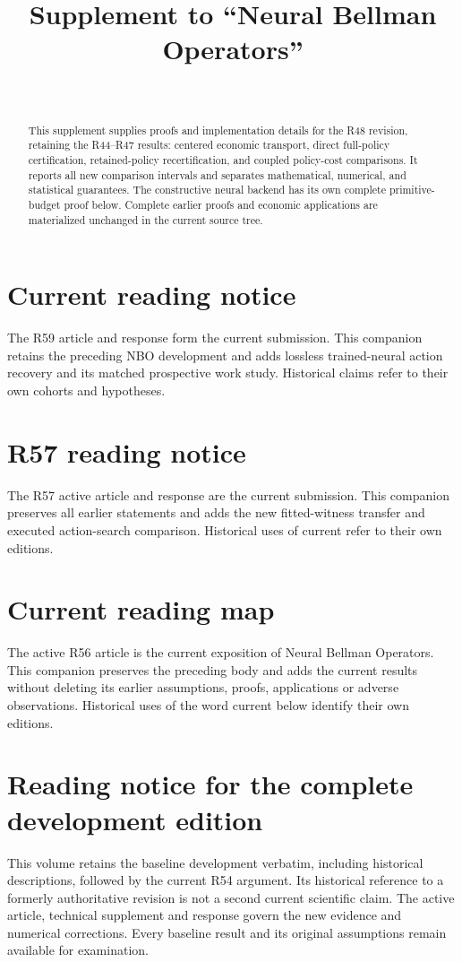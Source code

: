 \documentclass[ecta,nameyear,draft]{econsocart}
\begin{document}
\begin{frontmatter}
\title{Supplement to ``Neural Bellman Operators''}
\begin{aug}
\author[id=au1,addressref={add1}]{~}
\address[id=add1]{Peking University}
\end{aug}
\begin{abstract}
This supplement supplies proofs and implementation details for the R48 revision, retaining the R44--R47 results: centered economic transport, direct full-policy certification, retained-policy recertification, and coupled policy-cost comparisons. It reports all new comparison intervals and separates mathematical, numerical, and statistical guarantees. The constructive neural backend has its own complete primitive-budget proof below. Complete earlier proofs and economic applications are materialized unchanged in the current source tree.
\end{abstract}
\end{frontmatter}
\section*{Current reading notice}
The R59 article and response form the current submission. This companion retains the preceding NBO development and adds lossless trained-neural action recovery and its matched prospective work study. Historical claims refer to their own cohorts and hypotheses.

\section*{R57 reading notice}
The R57 active article and response are the current submission. This companion preserves all earlier statements and adds the new fitted-witness transfer and executed action-search comparison. Historical uses of current refer to their own editions.

\section*{Current reading map}
The active R56 article is the current exposition of Neural Bellman Operators. This companion preserves the preceding body and adds the current results without deleting its earlier assumptions, proofs, applications or adverse observations. Historical uses of the word current below identify their own editions.

\section*{Reading notice for the complete development edition}
This volume retains the baseline development verbatim, including historical descriptions, followed by the current R54 argument. Its historical reference to a formerly authoritative revision is not a second current scientific claim. The active article, technical supplement and response govern the new evidence and numerical corrections. Every baseline result and its original assumptions remain available for examination.
\end{document}
